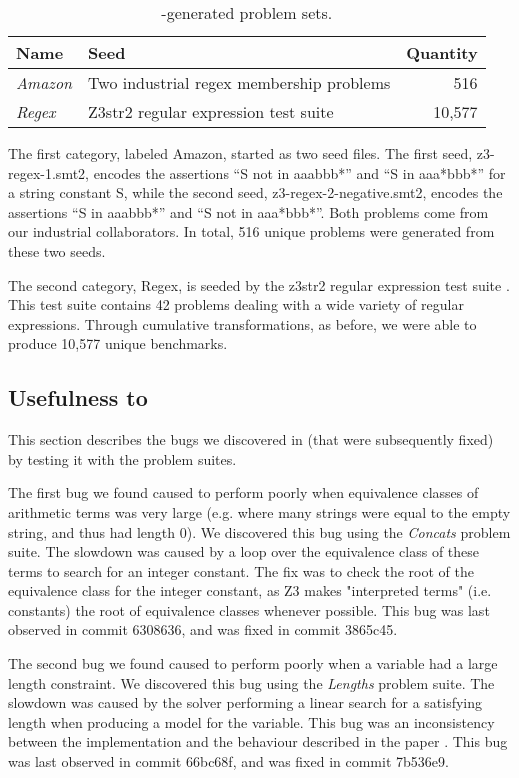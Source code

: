     \begin{table}
        \centering
        \begin{tabular}{|l|l|r|}
            \hline
            \textbf{Name}   & \textbf{Seed}                            & \textbf{Quantity} \\ \hline
            \textit{Amazon} & Two industrial regex membership problems & 516\\ \hline
            \textit{Regex}  & Z3str2 regular expression test suite     & 10,577\\ \hline
        \end{tabular}
        \caption{\transformer{}-generated problem sets.}
        \label{tbl:transformed}
    \end{table}

    The first category, labeled Amazon, started as two seed files.
    The first seed, z3-regex-1.smt2, encodes the assertions ``S not in aaabbb*'' and ``S in aaa*bbb*'' for a string constant S,
    while the second seed, z3-regex-2-negative.smt2, encodes the assertions ``S in aaabbb*'' and ``S not in aaa*bbb*''.
    Both problems come from our industrial collaborators.
    In total, 516 unique problems were generated from these two seeds.

    The second category, Regex, is seeded by the z3str2 regular expression test suite \cite{z3str2-tests}.
    This test suite contains 42 problems dealing with a wide variety of regular expressions.
    Through cumulative transformations, as before, we were able to produce 10,577 unique benchmarks.

    \subsection{Usefulness to \us{}}

        This section describes the bugs we discovered in \us{} (that were subsequently fixed) by testing it with the \fuzzer{} problem suites.

        The first bug we found caused \us{} to perform poorly when equivalence classes of arithmetic terms was very large (e.g. where many strings were equal to the empty string, and thus had length 0). We discovered this bug using the \textit{Concats} problem suite. The slowdown was caused by a loop over the equivalence class of these terms to search for an integer constant. The fix was to check the root of the equivalence class for the integer constant, as Z3 makes "interpreted terms" (i.e. constants) the root of equivalence classes whenever possible. This bug was last observed in commit 6308636, and was fixed in commit 3865c45.

        The second bug we found caused \us{} to perform poorly when a variable had a large length constraint. We discovered this bug using the \textit{Lengths} problem suite. The slowdown was caused by the solver performing a linear search for a satisfying length when producing a model for the variable. This bug was an inconsistency between the implementation and the behaviour described in the \us{} paper \cite{z3str3}. This bug was last observed in commit 66bc68f, and was fixed in commit 7b536e9.
